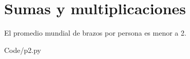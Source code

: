 \section{Sumas y multiplicaciones}

El promedio mundial de brazos por persona es menor a 2.

 {Code/p2.py}

